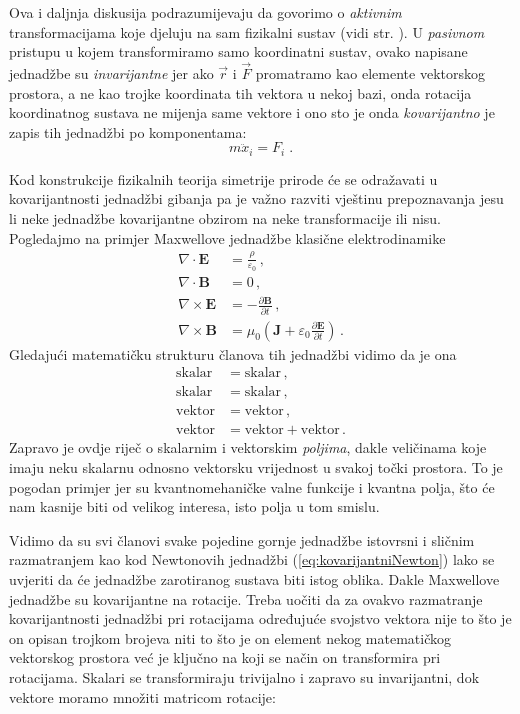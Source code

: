 Ova i daljnja diskusija podrazumijevaju da govorimo o \emph{aktivnim}
transformacijama koje djeluju na sam fizikalni sustav (vidi
str. \pageref{aktivna}). U \emph{pasivnom}
pristupu u kojem transformiramo samo koordinatni sustav,
ovako napisane jednadžbe su \emph{invarijantne} jer
ako $\vec{r}$ i $\vec{F}$ promatramo kao elemente vektorskog prostora,
a ne kao trojke koordinata tih vektora u nekoj bazi, onda rotacija
koordinatnog sustava ne mijenja same vektore i ono sto je onda
\emph{kovarijantno} je zapis tih jednadžbi po komponentama:
\begin{equation}
       m  \ddot{x}_{i} =  F_{i} \;.
\end{equation}

Kod konstrukcije fizikalnih teorija simetrije prirode će se odražavati
u kovarijantnosti jednadžbi gibanja pa je
važno razviti vještinu prepoznavanja jesu li neke jednadžbe
kovarijantne obzirom na neke transformacije ili nisu. Pogledajmo na primjer
Maxwellove jednadžbe klasične elektrodinamike
\begin{align}
    \nabla \cdot \mathbf{E}  &= \frac{\rho}{\varepsilon_0} \,, \label{eq:maxwell1} \\
\nabla \cdot \mathbf{B}  &= 0 \,, \\
\nabla \times \mathbf{E} &= -\frac{\partial \mathbf{B}}{\partial t}  \,,\\
\nabla \times \mathbf{B} &= \mu_0 \left(\mathbf{J} + 
    \varepsilon_0  \frac{\partial \mathbf{E}}{\partial t} \right) \,. \label{eq:maxwell4}
\end{align}
Gledajući matematičku strukturu članova tih jednadžbi vidimo da je ona
\begin{align*}
    \text{skalar} &= \text{skalar} \,, \\
    \text{skalar} &= \text{skalar}  \,,\\
    \text{vektor} &= \text{vektor}  \,,\\
    \text{vektor} &= \text{vektor} + \text{vektor} \,.
\end{align*}
Zapravo je ovdje riječ o skalarnim i vektorskim \emph{poljima}, dakle veličinama
koje imaju neku skalarnu odnosno vektorsku vrijednost u svakoj točki prostora.
To je pogodan primjer jer su kvantnomehaničke valne funkcije
i kvantna polja, što će nam kasnije biti od velikog interesa, isto polja u tom smislu.

Vidimo da su svi članovi svake pojedine gornje jednadžbe istovrsni i sličnim
razmatranjem kao kod
Newtonovih jednadžbi (\ref{eq:kovarijantniNewton}) lako se uvjeriti da
će jednadžbe zarotiranog
sustava biti istog oblika. Dakle Maxwellove jednadžbe su kovarijantne
na rotacije.
Treba uočiti da za ovakvo razmatranje kovarijantnosti jednadžbi pri rotacijama određujuće svojstvo 
vektora nije to što je on opisan trojkom brojeva niti
to što je on element nekog matematičkog vektorskog prostora već je ključno na koji
se način on transformira pri rotacijama. Skalari se transformiraju trivijalno i
zapravo su invarijantni, dok vektore moramo množiti matricom rotacije:

